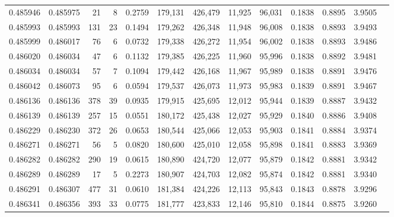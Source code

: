 \begin{tabular}{rrrrrrrrrrrrr}
0.485946 & 0.485975 &    21 &     8 &                                     0.2759 & 179,131 & 426,479 &  11,925 &  96,031 & 0.1838 & 0.8895 & 3.9505 \\
0.485993 & 0.485993 &   131 &    23 &                                     0.1494 & 179,262 & 426,348 &  11,948 &  96,008 & 0.1838 & 0.8893 & 3.9493 \\
0.485999 & 0.486017 &    76 &     6 &                                     0.0732 & 179,338 & 426,272 &  11,954 &  96,002 & 0.1838 & 0.8893 & 3.9486 \\
0.486020 & 0.486034 &    47 &     6 &                                     0.1132 & 179,385 & 426,225 &  11,960 &  95,996 & 0.1838 & 0.8892 & 3.9481 \\
0.486034 & 0.486034 &    57 &     7 &                                     0.1094 & 179,442 & 426,168 &  11,967 &  95,989 & 0.1838 & 0.8891 & 3.9476 \\
0.486042 & 0.486073 &    95 &     6 &                                     0.0594 & 179,537 & 426,073 &  11,973 &  95,983 & 0.1839 & 0.8891 & 3.9467 \\
0.486136 & 0.486136 &   378 &    39 &                                     0.0935 & 179,915 & 425,695 &  12,012 &  95,944 & 0.1839 & 0.8887 & 3.9432 \\
0.486139 & 0.486139 &   257 &    15 &                                     0.0551 & 180,172 & 425,438 &  12,027 &  95,929 & 0.1840 & 0.8886 & 3.9408 \\
0.486229 & 0.486230 &   372 &    26 &                                     0.0653 & 180,544 & 425,066 &  12,053 &  95,903 & 0.1841 & 0.8884 & 3.9374 \\
0.486271 & 0.486271 &    56 &     5 &                                     0.0820 & 180,600 & 425,010 &  12,058 &  95,898 & 0.1841 & 0.8883 & 3.9369 \\
0.486282 & 0.486282 &   290 &    19 &                                     0.0615 & 180,890 & 424,720 &  12,077 &  95,879 & 0.1842 & 0.8881 & 3.9342 \\
0.486289 & 0.486289 &    17 &     5 &                                     0.2273 & 180,907 & 424,703 &  12,082 &  95,874 & 0.1842 & 0.8881 & 3.9340 \\
0.486291 & 0.486307 &   477 &    31 &                                     0.0610 & 181,384 & 424,226 &  12,113 &  95,843 & 0.1843 & 0.8878 & 3.9296 \\
0.486341 & 0.486356 &   393 &    33 &                                     0.0775 & 181,777 & 423,833 &  12,146 &  95,810 & 0.1844 & 0.8875 & 3.9260 \\

\end{tabular}
